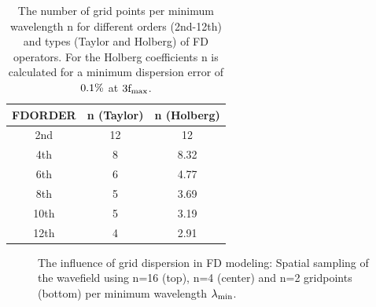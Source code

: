 \begin{table}[hbt]
\begin{center}
\begin{tabular}{ccc}\hline \hline
FDORDER & n (Taylor) & n (Holberg) \\ \hline 
2nd   &   12       &  12         \\
4th   &   8        &  8.32       \\
6th   &   6        &  4.77       \\
8th   &   5        &  3.69       \\ 
10th  &   5        &  3.19       \\
12th  &   4        &  2.91       \\
\hline \hline
\end{tabular}
\caption{\label{grid_disp.2} The number of grid points per minimum wavelength n for different orders (2nd-12th) and types (Taylor and
Holberg) of FD operators. For the Holberg coefficients n is calculated for a minimum dispersion error of $\rm{0.1\%}$ at $\rm{3 f_{max}}$.}
\end{center}
\end{table} 
\clearpage
\begin{figure}[ht]
\begin{center}
\caption{\label{grid_disp_pics} The influence of grid dispersion in FD modeling: Spatial sampling of the wavefield using n=16 (top), n=4 (center) and n=2 gridpoints (bottom) per minimum wavelength $\rm{\lambda_{min}}$.}
\end{center}
\end{figure}
\clearpage
